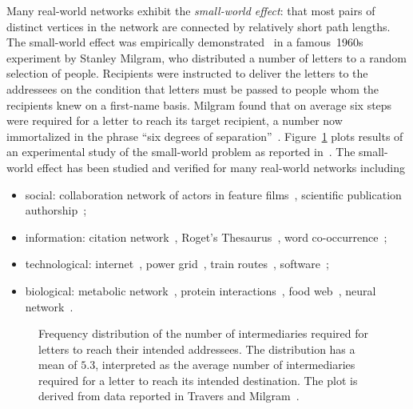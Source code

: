 Many real-world networks exhibit the
\emph{small-world effect}: that most pairs
of distinct vertices in the network are connected by relatively short
path lengths. The small-world effect was empirically
demonstrated~\cite{Milgram1967} in a famous~1960s experiment by
Stanley Milgram, who distributed a number
of letters to a random selection of people. Recipients were instructed
to deliver the letters to the addressees on the condition that letters
must be passed to people whom the recipients knew on a first-name
basis. Milgram found that on average six steps were required for a
letter to reach its target recipient, a number now immortalized in the
phrase ``six degrees of
separation''~\cite{Guare1990}.
Figure~\ref{fig:random_graphs:Milgram_small_world_experiment_results}
plots results of an experimental study of the small-world problem as
reported in~\cite{TraversMilgram1969}. The small-world effect has been
studied and verified for many real-world networks including
\begin{itemize}
\item social: collaboration network of actors in
  feature films~\cite{AmaralEtAl2000,WattsStrogatz1998}, scientific
  publication
  authorship~\cite{CastroGrossman1999,GrossmanIon1995,Newman2001a,Newman2001b};

\item information: citation
  network~\cite{Redner1998}, Roget's
  Thesaurus~\cite{Knuth1993}, word
  co-occurrence~\cite{DorogovtsevMendes2001,FerrerSole2001};

\item technological:
  internet~\cite{ChenEtAl2002,FaloutsosEtAl1999}, power
  grid~\cite{WattsStrogatz1998}, train routes~\cite{SenEtAl2003},
  software~\cite{Newman2003a,ValverdeEtAl2002};

\item biological: metabolic
  network~\cite{JeongEtAl2000}, protein
  interactions~\cite{JeongEtAl2001}, food
  web~\cite{HuxhamEtAl1996,Martinez1991}, neural
  network~\cite{WattsStrogatz1998,WhiteEtAl1986}.
\end{itemize}

\begin{figure}[!htbp]
\centering
{}

\caption{Frequency distribution of the number of intermediaries
  required for letters to reach their intended addressees. The
  distribution has a mean of $5.3$, interpreted as the average number
  of intermediaries required for a letter to reach its intended
  destination. The plot is derived from data reported in Travers and
  Milgram~\cite{TraversMilgram1969}.}
\label{fig:random_graphs:Milgram_small_world_experiment_results}
\end{figure}

